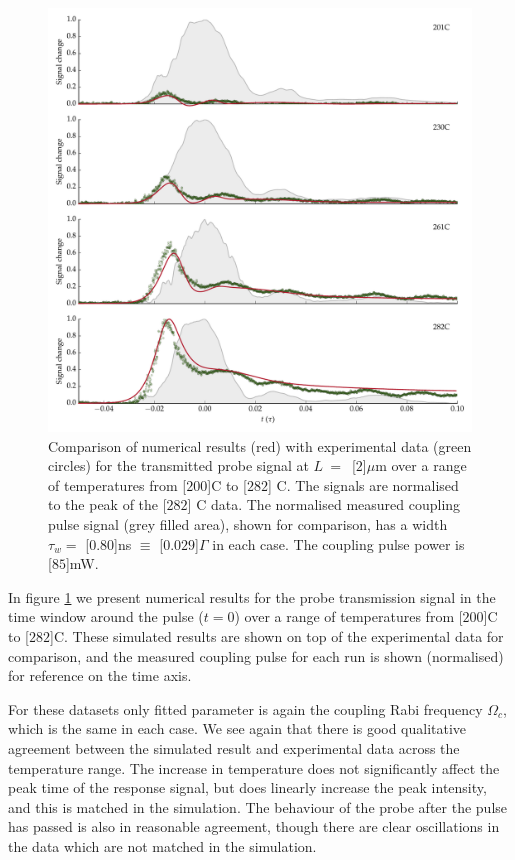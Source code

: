     \begin{figure}[p]
    \includegraphics[width=\linewidth]{figs/06_simultons/mb_vee2g_exp_plot_temp_282_fig1.pdf}
    \caption{
    Comparison of numerical results (red) with experimental data (green circles)
    for the transmitted probe signal at $L~=$~\unit[$2$]{$\mu$m} over a range of
    temperatures from \unit[$200$]{\textdegree C} to \unit[$282$]{\textdegree
    C}. The signals are normalised to the peak of the \unit[$282$]{\textdegree
    C} data. The normalised measured coupling pulse signal (grey filled area),
    shown for comparison, has a width $\tau_w = $ \unit[$0.80$]{ns} $ \equiv $
    \unit[$0.029$]{$\Gamma$} in each case. The coupling pulse power is
    \unit[$85$]{mW}.
    } 
    \label{fig:exp_result_temp_dep} 
    \end{figure}

    In figure \ref{fig:exp_result_temp_dep} we present numerical results for the
    probe transmission signal in the time window around the pulse ($t\!=\!0$)
    over a range of temperatures from \unit[$200$]{\textdegree C} to
    \unit[$282$]{\textdegree C}. These simulated results are shown on top of the
    experimental data for comparison, and the measured coupling pulse for each
    run is shown (normalised) for reference on the time axis.

    For these datasets only fitted parameter is again the coupling Rabi
    frequency $\Omega_c$, which is the same in each case. We see again that
    there is good qualitative agreement between the simulated result and
    experimental data across the temperature range. The increase in temperature
    does not significantly affect the peak time of the response signal, but does
    linearly increase the peak intensity, and this is matched in the simulation.
    The behaviour of the probe after the pulse has passed is also in reasonable
    agreement, though there are clear oscillations in the data which are not
    matched in the simulation.


